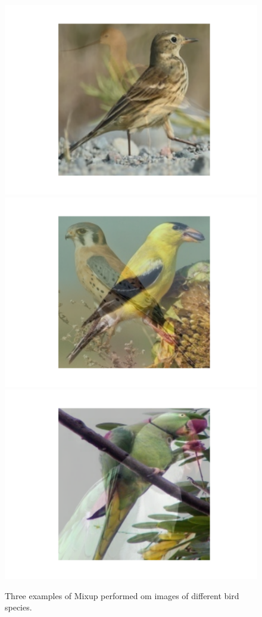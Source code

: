 \documentclass{article}
\begin{document}
\begin{figure}[!htb]
	\includegraphics[trim=3cm 2cm 3cm 3cm, width=\linewidth]{mixup1.pdf}
	\endminipage\hfill
	\includegraphics[trim=3cm 2cm 3cm 3cm, width=\linewidth]{mixup2.pdf}
	\endminipage\hfill
	\includegraphics[trim=3cm 2cm 3cm 3cm, width=\linewidth]{mixup3.pdf}
	\endminipage
	\caption{Three examples of Mixup performed om images of different bird species.}
\end{figure}
\end{document}
